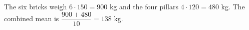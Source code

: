 The six bricks weigh $6\cdot150=900$ kg and the four pillars $4\cdot120=480$ kg. The combined mean is $\dfrac{900+480}{10}=\boxed{138\text{ kg}}$.
